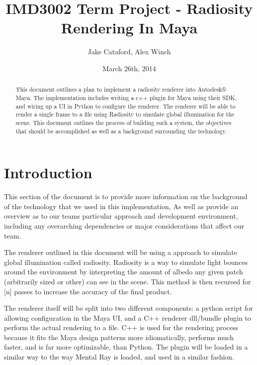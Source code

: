 \documentclass{report}
\begin{document}
\title{IMD3002 Term Project - Radiosity Rendering In Maya}
\author{Jake Cataford, Alex Winch}
\date{March 26th, 2014}
\maketitle

\begin{abstract}
This document outlines a plan to implement a radiosity renderer into Autodesk®
Maya. The implementation includes writing a c++ plugin for Maya using their SDK,
and wiring up a UI in Python to configure the renderer. The renderer will be
able to render a single frame to a file using Radiosity to simulate global
illumination for the scene. This document outlines the process of building such
a system, the objectives that should be accomplished as well as a background
surrounding the technology.
\end{abstract}
\tableofcontents
\chapter{Introduction}
This section of the document is to provide more information on the background of
the technology that we used in this implementation, As well as provide an overview
as to our teams particular approach and development environment, including any
overarching dependencies or major considerations that affect our team.

The renderer outlined in this document will be using a approach to simulate
global illumination called radiosity. Radiosity is a way to simulate light
bounces around the environment by interpreting the amount of albedo any given
patch (arbitrarily sized or other) can see in the scene. This method is then
recursed for [n] passes to increase the accuracy of the final product.

The renderer itself will be split into two different components: a python script
for allowing configuration in the Maya UI, and a C++ renderer dll/bundle plugin
to perform the actual rendering to a file. C++  is used for the rendering
process because it fits the Maya design patterns more idiomatically,
performs much faster, and is far more optimizable, than Python. The plugin will
be loaded in a similar way to the way Mental Ray is loaded, and used in
a similar fashion.
\end{document}
